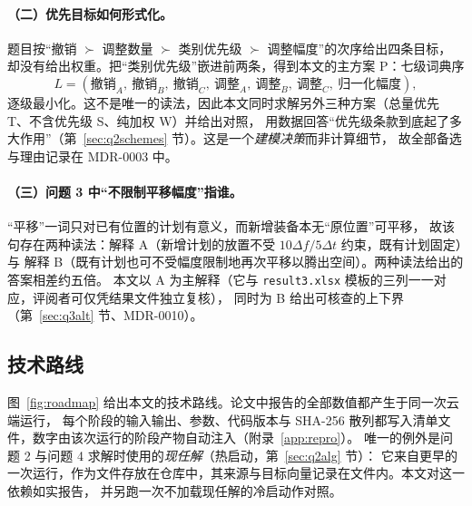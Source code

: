 \paragraph{（二）优先目标如何形式化。}题目按“撤销 $\succ$ 调整数量 $\succ$ 类别优先级 $\succ$ 调整幅度”的次序给出四条目标，
却没有给出权重。把“类别优先级”嵌进前两条，得到本文的主方案 P：七级词典序
\[
  L=(\text{撤销}_A,\ \text{撤销}_B,\ \text{撤销}_C,\ \text{调整}_A,\ \text{调整}_B,\ \text{调整}_C,\ \text{归一化幅度}),
\]
逐级最小化。这不是唯一的读法，因此本文同时求解另外三种方案（总量优先 T、不含优先级 S、纯加权 W）并给出对照，
用数据回答“优先级条款到底起了多大作用”（第~\ref{sec:q2schemes} 节）。这是一个\emph{建模决策}而非计算细节，
故全部备选与理由记录在 MDR-0003 中。

\paragraph{（三）问题 3 中“不限制平移幅度”指谁。}“平移”一词只对已有位置的计划有意义，而新增装备本无“原位置”可平移，
故该句存在两种读法：解释 A（新增计划的放置不受 $10\Delta f/5\Delta t$ 约束，既有计划固定）与
解释 B（既有计划也可不受幅度限制地再次平移以腾出空间）。两种读法给出的答案相差约五倍。
本文以 A 为主解释（它与 \nolinkurl{result3.xlsx} 模板的三列一一对应，评阅者可仅凭结果文件独立复核），
同时为 B 给出可核查的上下界（第~\ref{sec:q3alt} 节、MDR-0010）。

\subsection{技术路线}

图~\ref{fig:roadmap} 给出本文的技术路线。论文中报告的全部数值都产生于同一次云端运行，
每个阶段的输入输出、参数、代码版本与 SHA-256 散列都写入清单文件，数字由该次运行的阶段产物自动注入（附录~\ref{app:repro}）。
唯一的例外是问题 2 与问题 4 求解时使用的\emph{现任解}（热启动，第~\ref{sec:q2alg} 节）：
它来自更早的一次运行，作为文件存放在仓库中，其来源与目标向量记录在文件内。本文对这一依赖如实报告，
并另跑一次不加载现任解的冷启动作对照。

